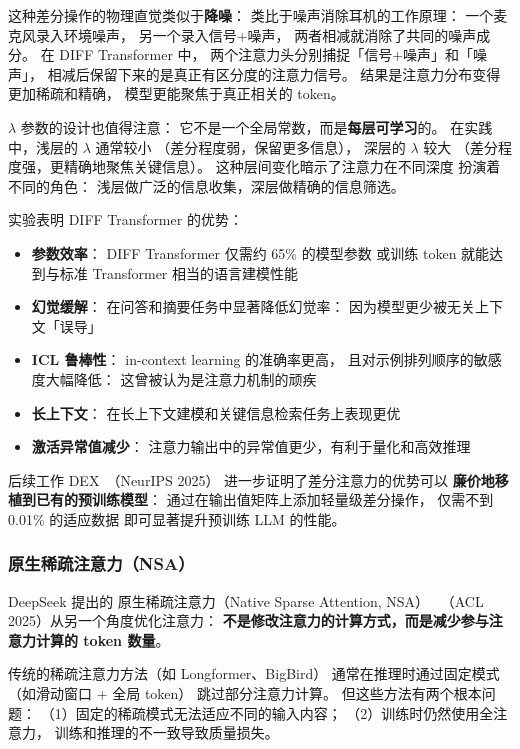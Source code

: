 这种差分操作的物理直觉类似于\textbf{降噪}：
类比于噪声消除耳机的工作原理：
一个麦克风录入环境噪声，
另一个录入信号+噪声，
两者相减就消除了共同的噪声成分。
在 DIFF Transformer 中，
两个注意力头分别捕捉「信号+噪声」和「噪声」，
相减后保留下来的是真正有区分度的注意力信号。
结果是注意力分布变得更加稀疏和精确，
模型更能聚焦于真正相关的 token。

$\lambda$ 参数的设计也值得注意：
它不是一个全局常数，而是\textbf{每层可学习}的。
在实践中，浅层的 $\lambda$ 通常较小
（差分程度弱，保留更多信息），
深层的 $\lambda$ 较大
（差分程度强，更精确地聚焦关键信息）。
这种层间变化暗示了注意力在不同深度
扮演着不同的角色：
浅层做广泛的信息收集，深层做精确的信息筛选。

实验表明 DIFF Transformer 的优势：
\begin{itemize}[noitemsep]
  \item \textbf{参数效率}：
        DIFF Transformer 仅需约 65\% 的模型参数
        或训练 token 就能达到与标准 Transformer 相当的语言建模性能
  \item \textbf{幻觉缓解}：
        在问答和摘要任务中显著降低幻觉率：
        因为模型更少被无关上下文「误导」
  \item \textbf{ICL 鲁棒性}：
        in-context learning 的准确率更高，
        且对示例排列顺序的敏感度大幅降低：
        这曾被认为是注意力机制的顽疾
  \item \textbf{长上下文}：
        在长上下文建模和关键信息检索任务上表现更优
  \item \textbf{激活异常值减少}：
        注意力输出中的异常值更少，有利于量化和高效推理
\end{itemize}

后续工作 DEX~\cite{kong2025dex}（NeurIPS 2025）
进一步证明了差分注意力的优势可以
\textbf{廉价地移植到已有的预训练模型}：
通过在输出值矩阵上添加轻量级差分操作，
仅需不到 0.01\% 的适应数据
即可显著提升预训练 LLM 的性能。

\subsubsection{原生稀疏注意力（NSA）}

DeepSeek 提出的
原生稀疏注意力（Native Sparse Attention, NSA）~\cite{yuan2025nsa}
（ACL 2025）从另一个角度优化注意力：
\textbf{不是修改注意力的计算方式，而是减少参与注意力计算的 token 数量}。

传统的稀疏注意力方法（如 Longformer、BigBird）
通常在推理时通过固定模式（如滑动窗口 + 全局 token）
跳过部分注意力计算。
但这些方法有两个根本问题：
（1）固定的稀疏模式无法适应不同的输入内容；
（2）训练时仍然使用全注意力，
训练和推理的不一致导致质量损失。

